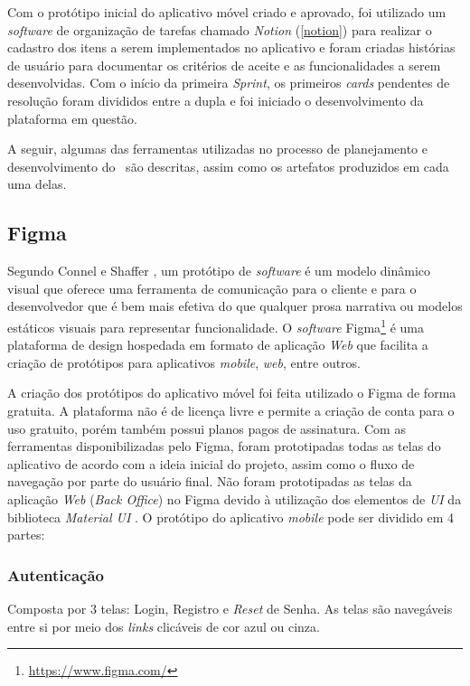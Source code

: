 Com o protótipo inicial do aplicativo móvel criado e aprovado, foi utilizado um \textit{software} de organização de tarefas chamado \textit{Notion} (\ref{notion}) para realizar o cadastro dos itens a serem implementados no aplicativo e foram criadas histórias de usuário para documentar os critérios de aceite e as funcionalidades a serem desenvolvidas. Com o início da primeira \textit{Sprint}, os primeiros \textit{cards} pendentes de resolução foram divididos entre a dupla e foi iniciado o desenvolvimento da plataforma em questão.

A seguir, algumas das ferramentas utilizadas no processo de planejamento e desenvolvimento do \appName\ são descritas, assim como os artefatos produzidos em cada uma delas.

\subsection{Figma}
\label{figma}

Segundo Connel e Shaffer \cite{prototyping}, um protótipo de \textit{software} é um modelo dinâmico visual que oferece uma ferramenta de comunicação para o cliente e para o desenvolvedor que é bem mais efetiva do que qualquer prosa narrativa ou modelos estáticos visuais para representar funcionalidade. O \textit{software} Figma\footnote{\url{https://www.figma.com/}} é uma plataforma de design hospedada em formato de aplicação \textit{Web} que facilita a criação de protótipos para aplicativos \textit{mobile}, \textit{web}, entre outros.

A criação dos protótipos do aplicativo móvel foi feita utilizado o Figma de forma gratuita. A plataforma não é de licença livre e permite a criação de conta para o uso gratuito, porém também possui planos pagos de assinatura. Com as ferramentas disponibilizadas pelo Figma, foram prototipadas todas as telas do aplicativo de acordo com a ideia inicial do projeto, assim como o fluxo de navegação por parte do usuário final. Não foram prototipadas as telas da aplicação \textit{Web} (\textit{Back Office}) no Figma devido à utilização dos elementos de \textit{UI} da biblioteca \textit{Material UI} \cite{mui}. O protótipo do aplicativo \textit{mobile} pode ser dividido em 4 partes:

\subsubsection{Autenticação}

Composta por 3 telas: Login, Registro e \textit{Reset} de Senha. As telas são navegáveis entre si por meio dos \textit{links} clicáveis de cor azul ou cinza.

